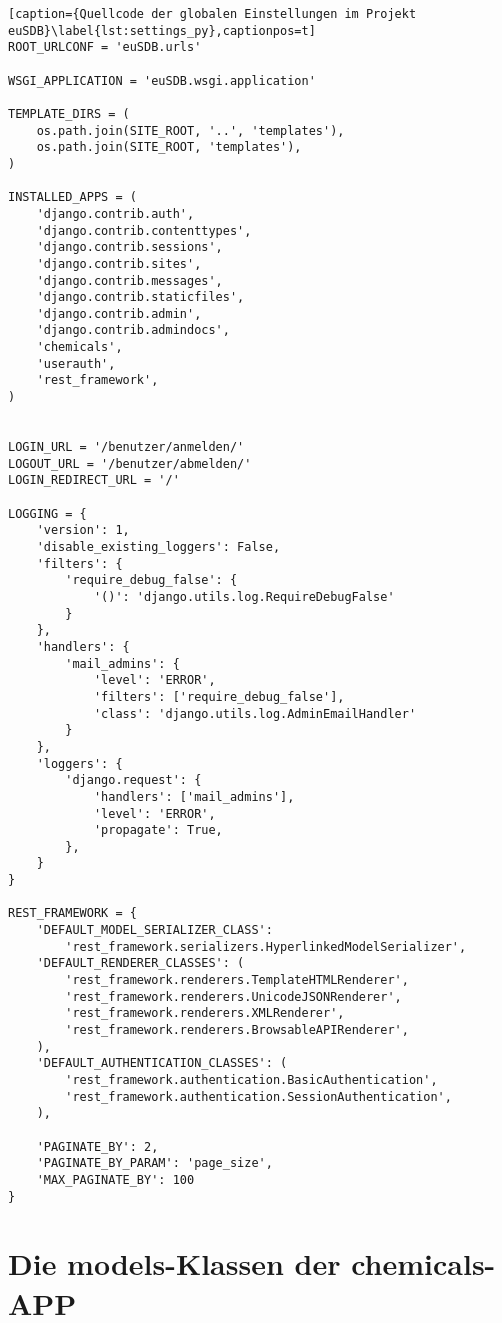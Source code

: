 \begin{lstlisting}[caption={Quellcode der globalen Einstellungen im Projekt
euSDB}\label{lst:settings_py},captionpos=t]
ROOT_URLCONF = 'euSDB.urls'

WSGI_APPLICATION = 'euSDB.wsgi.application'

TEMPLATE_DIRS = (
    os.path.join(SITE_ROOT, '..', 'templates'),
    os.path.join(SITE_ROOT, 'templates'),
)

INSTALLED_APPS = (
    'django.contrib.auth',
    'django.contrib.contenttypes',
    'django.contrib.sessions',
    'django.contrib.sites',
    'django.contrib.messages',
    'django.contrib.staticfiles',
    'django.contrib.admin',
    'django.contrib.admindocs',
    'chemicals',
    'userauth',
    'rest_framework',
)


LOGIN_URL = '/benutzer/anmelden/'
LOGOUT_URL = '/benutzer/abmelden/'
LOGIN_REDIRECT_URL = '/'

LOGGING = {
    'version': 1,
    'disable_existing_loggers': False,
    'filters': {
        'require_debug_false': {
            '()': 'django.utils.log.RequireDebugFalse'
        }
    },
    'handlers': {
        'mail_admins': {
            'level': 'ERROR',
            'filters': ['require_debug_false'],
            'class': 'django.utils.log.AdminEmailHandler'
        }
    },
    'loggers': {
        'django.request': {
            'handlers': ['mail_admins'],
            'level': 'ERROR',
            'propagate': True,
        },
    }
}

REST_FRAMEWORK = {
    'DEFAULT_MODEL_SERIALIZER_CLASS':
        'rest_framework.serializers.HyperlinkedModelSerializer',
    'DEFAULT_RENDERER_CLASSES': (
        'rest_framework.renderers.TemplateHTMLRenderer',
        'rest_framework.renderers.UnicodeJSONRenderer',
        'rest_framework.renderers.XMLRenderer',
        'rest_framework.renderers.BrowsableAPIRenderer',
    ),
    'DEFAULT_AUTHENTICATION_CLASSES': (
        'rest_framework.authentication.BasicAuthentication',
        'rest_framework.authentication.SessionAuthentication',
    ),

    'PAGINATE_BY': 2,
    'PAGINATE_BY_PARAM': 'page_size',
    'MAX_PAGINATE_BY': 100
}    
 \end{lstlisting}
 
\section{Die models-Klassen der chemicals-APP}
\label{model_py}

